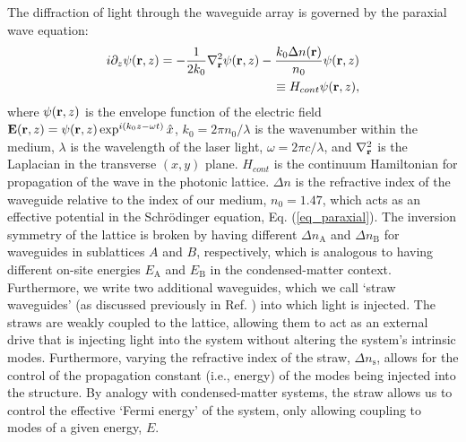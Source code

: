 \documentclass[prl,twocolumn,showpacs,amsmath,amssymb,superscriptaddress]{revtex4-1}
\begin{document}
The diffraction of light through the waveguide array is governed by the paraxial wave equation:
\begin{equation}
\begin{split}
i\partial_{z}\psi(\textbf{\textrm{r}},z) = -\frac{1}{2k_{0}}\nabla^{2}_{\textbf{\textrm{r}}}\psi(\textbf{\textrm{r}},z)-\frac{k_{0}\Delta n(\textbf{\textrm{r}})}{n_{0}}\psi (\textbf{\textrm{r}},z)\\
\equiv H_{cont}\psi(\textbf{\textrm{r}},z),
\label{eq_paraxial}
\end{split}
\end{equation}
where $\psi(\textbf{\textrm{r}},z)$ is the envelope function of the electric field $\textrm{\textbf{E}}(\textbf{\textrm{r}},z)=\psi(\textbf{\textrm{r}},z)\exp^{i(k_{0}z-\omega t)}\hat{x}$, $k_{0}=2\pi n_{0}/\lambda$ is the wavenumber within the medium, $\lambda$ is the wavelength of the laser light, $\omega = 2\pi c/\lambda$, and $\nabla^{2}_{\textbf{\textrm{r}}}$ is the Laplacian in the transverse $(x,y)$ plane. $H_{cont}$ is the continuum Hamiltonian for propagation of the wave in the photonic lattice.
$\Delta n$ is the refractive index of the waveguide relative to the index of our medium, $n_{0}=1.47$, which acts as an effective potential in the Schr\"{o}dinger equation, Eq. (\ref{eq_paraxial}).
The inversion symmetry of the lattice is broken by having different $\Delta n_{\textrm{A}}$ and $\Delta n_{\textrm{B}}$ for waveguides in sublattices $A$ and $B$, respectively, which is analogous to having different on-site energies $E_{\textrm{A}}$ and $E_{\textrm{B}}$ in the condensed-matter context.
Furthermore, we write two additional waveguides, which we call `straw waveguides' (as discussed previously in Ref. \cite{CleoFTAI}) into which light is injected.
The straws are weakly coupled to the lattice, allowing them to act as an external drive that is injecting light into the system without altering the system's intrinsic modes.
Furthermore, varying the refractive index of the straw, $\Delta n_{\textrm{s}}$, allows for the control of the propagation constant (i.e., energy) of the modes being injected into the structure.
By analogy with condensed-matter systems, the straw allows us to control the effective `Fermi energy' of the system, only allowing coupling to modes of a given energy, $E$.
\end{document}

